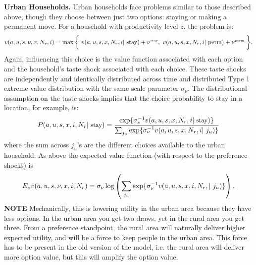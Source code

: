\documentclass[pdftex,11pt]{article}
\begin{document}
\textbf{Urban Households.} Urban households face problems similar to those described above, though they choose between just two options: staying or making a permanent move. For a household with productivity level $z$, the problem is:
\begin{align}
v(a, u, s, \nu, x, N_r, i) = \max \bigg\{ \ v(a, u, s, x, N_r, i| \ \mbox{stay}) + \nu^{\tiny\mbox{stay}}, \  v(a, u, s, x, N_r,  i| \ \mbox{perm}) + \nu^{\tiny\mbox{perm}} \ \bigg \}.
\label{eq:bellman_urban}
\end{align}
Again, influencing this choice is the value function associated with each option and the household's taste shock associated with each choice. These taste shocks are independently and identically distributed across time and distributed Type 1 extreme value distribution with the same scale parameter $\sigma_{\nu}$. The distributional assumption on the taste shocks implies that the choice probability to stay in a location, for example, is:
\begin{eqnarray*}
\small
P(a, u, s, x, i, N_r| \ \mbox{stay}) = \frac{\exp\{\sigma_{\nu}^{-1} v(a, u, s, x, N_r, i| \ \mbox{stay})  \}}{\sum_{j_u} \exp\{\sigma_{\nu}^{-1} v(a, u, s, x, N_r, i| \ j_u)\}}
\end{eqnarray*}
where the sum across $j_u$'s are the different choices available to the urban household. As above the expected value function (with respect to the preference shocks) is
\begin{eqnarray*}
\small
E_{\nu} v(a, u, s, \nu, x, i, N_r) = \sigma_{\nu} \log \left( \sum_{j_u} \exp\{\sigma_{\nu}^{-1} v(a, u,  s, x, i, N_r, | \ j_u)\} \right).
\end{eqnarray*}
\textbf{NOTE} Mechanically, this is lowering utility in the urban area because they have less options. In the urban area you get two draws, yet in the rural area you get three. From a preference standpoint, the rural area will naturally deliver higher expected utility, and will be a force to keep people in the urban area. This force has to be present in the old version of the model, i.e. the rural area will deliver more option value, but this will amplify the option value.
\end{document}
